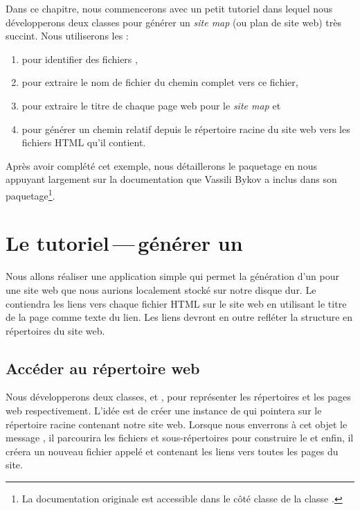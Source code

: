 \documentclass[a4paper,10pt,twoside]{book}
\begin{document}
Dans ce chapitre, nous commencerons avec un petit tutoriel dans lequel
nous développerons deux classes pour générer un \emph{site map} (ou
plan de site web) très succint.
Nous utiliserons les \expregs:
\begin{enumerate}
\item pour identifier des fichiers ,
\item pour extraire
le nom de fichier du chemin complet vers ce fichier, 
\item pour extraire le titre de chaque page web pour le \emph{site
    map} et
\item pour générer un chemin relatif depuis le répertoire racine du
  site web vers les fichiers HTML qu'il contient.
\end{enumerate}
Après avoir complété cet exemple, nous détaillerons le paquetage
\pkgregex en nous appuyant largement sur la documentation que Vassili
Bykov a inclus dans son paquetage\footnote{La documentation originale
  est accessible dans le côté classe de la classe .}.

\section{Le tutoriel\,---\,générer un \sitemap}


Nous allons réaliser une application simple qui permet la génération
d'un \sitemap pour une site web que nous aurions localement stocké sur
notre disque dur. Le \sitemap contiendra les liens vers chaque fichier
HTML sur le site web en utilisant le titre de la page comme texte du
lien. Les liens devront en outre refléter la structure en répertoires
du site web.

\subsection{Accéder au répertoire web}


Nous développerons deux classes,  et , pour
représenter les répertoires et les pages web respectivement. L'idée
est de créer une instance de  qui pointera sur le
répertoire racine contenant notre site web. Lorsque nous enverrons à
cet objet le message , il parcourira les fichiers et
sous-répertoires pour construire le \sitemap et enfin, il créera un
nouveau fichier appelé  et contenant les liens vers
toutes les pages du site.
\end{document}

